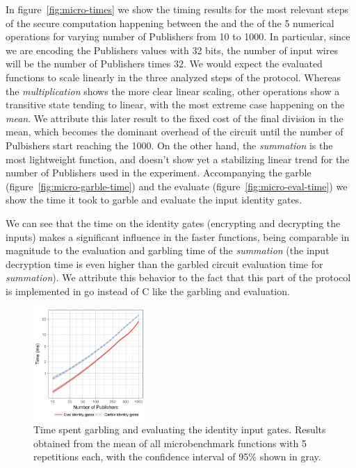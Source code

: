 In figure~\ref{fig:micro-times} we show the timing results for the most
relevant steps of the secure computation happening between the \broker and the
\garbler of the 5 numerical operations for varying number of Publishers from 10
to 1000.  In particular, since we are encoding the Publishers values with 32
bits, the number of input wires will be the number of Publishers times 32.  We
would expect the evaluated functions to scale linearly in the three analyzed
steps of the protocol.  Whereas the \emph{multiplication} shows the more clear
linear scaling, other operations show a transitive state tending to linear,
with the most extreme case happening on the \emph{mean}.  We attribute this
later result to the fixed cost of the final division in the mean, which becomes
the dominant overhead of the circuit until the number of Pulbishers start
reaching the 1000.  On the other hand, the \emph{summation} is the most
lightweight function, and doesn't show yet a stabilizing linear trend for the
number of Publishers used in the experiment.  Accompanying the garble
(figure~\ref{fig:micro-garble-time}) and the evaluate
(figure~\ref{fig:micro-eval-time}) we show the time it took to garble and
evaluate the input identity gates.

We can see that the time on the identity gates (encrypting and decrypting the
inputs) makes a significant influence in the faster functions, being comparable
in magnitude to the evaluation and garbling time of the \emph{summation}
(the input decryption time is even higher than the garbled circuit evaluation
time for \emph{summation}).  We attribute this behavior to the fact that this
part of the protocol is implemented in go instead of C like the garbling and
evaluation.

\begin{figure}
  \includegraphics[width=0.38\textwidth]{plots/enc_dec.png}
  \caption{Time spent garbling and evaluating the identity input gates.
    Results obtained from the mean of all microbenchmark functions with 5
    repetitions each, with the confidence interval of 95\% shown in gray.}
  \label{micro-inputs}
\end{figure}


